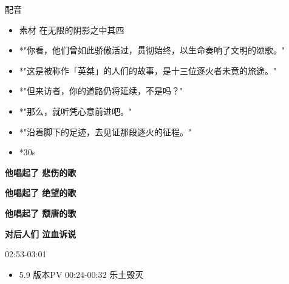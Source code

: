 \documentclass[a4paper]{article}
\begin{document}
配音

\begin{itemize}
    \item 素材 在无限的阴影之中其四
    \item *"你看，他们曾如此骄傲活过，贯彻始终，以生命奏响了文明的颂歌。"
    \item *"这是被称作「英桀」的人们的故事，是十三位逐火者未竟的旅途。"
    \item *"但来访者，你的道路仍将延续，不是吗？"
    \item *"那么，就听凭心意前进吧。"
    \item *"沿着脚下的足迹，去见证那段逐火的征程。"
    \item *30s
\end{itemize}



\textbf{他唱起了 悲伤的歌}

\textbf{他唱起了 绝望的歌}

\textbf{他唱起了 颓唐的歌}

\textbf{对后人们 泣血诉说}

02:53-03:01

\begin{itemize}
    \item 5.9 版本PV 00:24-00:32 乐土毁灭
\end{itemize}

\end{document}
